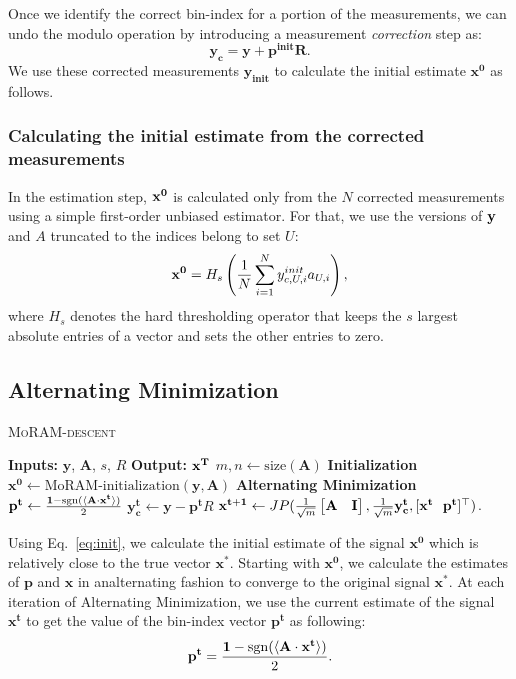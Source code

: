 Once we identify the correct bin-index for a portion of the measurements, we can undo the modulo operation by introducing a measurement \emph{correction} step as:
$$
\mathbf{y_{c} = y + p^{init}R}.
$$
We use these corrected measurements $\mathbf{y_{init}}$ to calculate the initial estimate $\mathbf{{x}^0}$ as follows.

\subsubsection{Calculating the initial estimate from the corrected measurements}
In the estimation step, $\mathbf{x^0}$ is calculated only from the $N$ corrected measurements using a simple first-order unbiased estimator. For that, we use the versions of $\mathbf{y}$ and $A$ truncated to the indices belong to set $U$:
\begin{equation}
\mb{x^0} = H_s\left( \frac{1}{N}\sum_{i=1}^{N}y^{init}_{c,U,i}a_{U,i}\right),
\label{eq:init}
\end{equation}
where $H_s$ denotes the hard thresholding operator that keeps the $s$ largest absolute entries of a vector and sets the other entries to zero.


\subsection{Alternating Minimization}
\label{sec:altmin}
\begin{algorithm}[t]
	\caption{\textsc{MoRAM-descent}}
	\label{alg:MoRAM}
	\begin{algorithmic}
		\State\textbf{Inputs:} $\mathbf{y}$, $\mathbf{A}$, $s$, $R$
		\State\textbf{Output:}  $\mathbf{x^T}$
		\State $m,n \leftarrow \mathrm{size}(\mathbf{A})$ 
		\State \textbf{Initialization}
		\State $\mathbf{x^0} \leftarrow \textrm{MoRAM-initialization}(\mathbf{y, A})$ 
		\State \textbf{Alternating Minimization}
		\State $\mathbf{{p}^{t}} \leftarrow \frac{\mathbf{1}-\mathrm{sgn}(\langle \mathbf{A} \cdot \mathbf{x^t} \rangle)}{2}$
		\State $\mathbf{y^t_c} \leftarrow \mathbf{y} - \mathbf{p^t}R$
		\State $\mathbf{{x}^{t+1}}\leftarrow \small{JP(\frac{1}{\sqrt{m}}\begin{bmatrix} \mathbf{A} & \mathbf{I} \end{bmatrix},\frac{1}{\sqrt{m}}\mathbf{y^t_c},[\mathbf{x^t~~p^t}]^\t)}$.
		\EndFor
	\end{algorithmic}
\end{algorithm}

Using Eq.~\ref{eq:init}, we calculate the initial estimate of the signal $\mathbf{{x}^0}$ which is relatively close to the true vector $\mathbf{x^*}$. Starting with $\mathbf{{x}^0}$, we calculate the estimates of $\mathbf{p}$ and $\mathbf{x}$ in analternating fashion to converge to the original signal $\mathbf{x^*}$. At each iteration of Alternating Minimization, we use the current estimate of the signal ${\mathbf{x^t}}$ to get the value of the bin-index vector $\mathbf{{p}^t}$ as following:
\begin{equation}
\mathbf{{p}^{t}} = \frac{\mathbf{1}-\sgn(\langle \mathbf{A} \cdot \mathbf{x^t} \rangle)}{2}.
\label{step1}
\end{equation}

